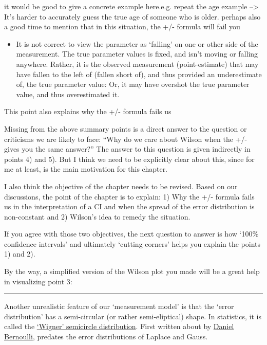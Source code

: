 \documentclass[]{book}
\providecommand{\tightlist}{%
  \setlength{\itemsep}{0pt}\setlength{\parskip}{0pt}}
\begin{document}
it would be good to give a concrete example here.e.g. repeat the age example --\textgreater{} It's harder to accurately guess the true age of someone who is older.
perhaps also a good time to mention that in this situation, the +/- formula will fail you

\begin{itemize}
\tightlist
\item
  It is not correct to view the parameter as `falling' on one or other side of the measurement. The true parameter values is fixed, and isn't moving or falling anywhere. Rather, it is the observed measurement (point-estimate) that may have fallen to the left of (fallen short of), and thus provided an underestimate of, the true parameter value: Or, it may have overshot the true parameter value, and thus overestimated it.
\end{itemize}

This point also explains why the +/- formula fails us

Missing from the above summary points is a direct answer to the question or criticisms we are likely to face: ``Why do we care about Wilson when the +/- gives you the same answer?''
The answer to this question is given indirectly in points 4) and 5). But I think we need to be explicitly clear about this, since for me at least, is the main motivation for this chapter.

I also think the objective of the chapter needs to be revised. Based on our discussions, the point of the chapter is to explain:
1) Why the +/- formula fails us in the interpretation of a CI and when the spread of the error distribution is non-constant and
2) Wilson's idea to remedy the situation.

If you agree with those two objectives, the next question to answer is how `100\% confidence intervals' and ultimately `cutting corners' helps you explain the points 1) and 2).

By the way, a simplified version of the Wilson plot you made will be a great help in visualizing point 3:

\begin{center}\rule{0.5\linewidth}{\linethickness}\end{center}

Another unrealistic feature of our `measurement model' is that the `error distribution' has a semi-circular (or rather semi-eliptical) shape. In statistics, it is called the \href{https://en.wikipedia.org/wiki/Wigner_semicircle_distribution}{`Wigner' semicircle distribution}. First written about by \href{http://www.medicine.mcgill.ca/epidemiology/hanley/bios601/Likelihood/Kendall1961OnDanielBernoulliML.pdf}{Daniel Bernoulli}, predates the error distributions of Laplace and Gauss.
\end{document}
